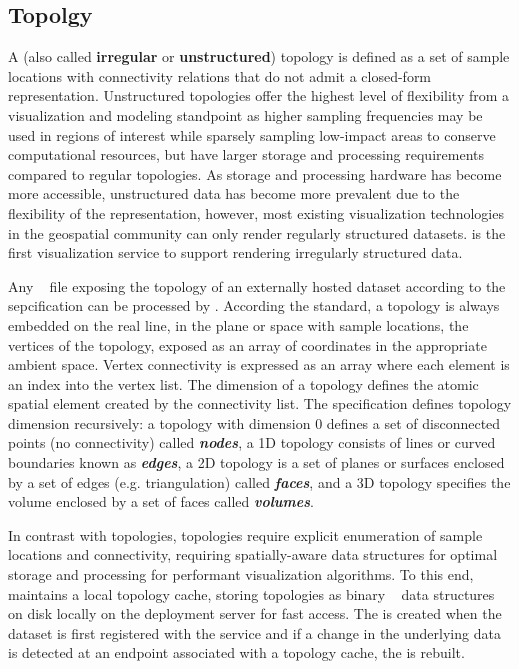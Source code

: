 \subsection{\ugrid{} Topolgy}
\label{sec:ugrid}
A \ugrid{} (also called {\bf irregular} or {\bf unstructured})
topology is defined as a set of sample locations with connectivity
relations that do not admit a closed-form representation. Unstructured
topologies offer the highest level of flexibility from a visualization
and modeling standpoint as higher sampling frequencies may be used in
regions of interest while sparsely sampling low-impact areas to
conserve computational resources, but have larger storage and
processing requirements compared to regular topologies. As storage and
processing hardware has become more accessible, unstructured data has
become more prevalent due to the flexibility of the
representation, however, most existing visualization technologies in
the geospatial community can only render regularly structured
datasets. \sciwms{} is the first visualization service to
support rendering irregularly structured data.

Any \ncml{}~\cite{ncml06} file exposing the topology of an externally
hosted dataset according to the \cfugrid{} sepcification can be
processed by \sciwms{}. According the \cfugrid{} standard, a topology
is always embedded on the real line, in the plane or space with sample
locations, the vertices of the topology, exposed as an array of
coordinates in the appropriate ambient space. Vertex connectivity is
expressed as an array where each element is an index into the vertex
list. The dimension of a topology defines the atomic spatial element
created by the connectivity list. The \cfugrid{} specification defines
topology dimension recursively: a topology with dimension 0 defines a
set of disconnected points (no connectivity) called
\textbf{\textit{nodes}}, a 1D topology consists of lines or curved
boundaries known as \textbf{\textit{edges}}, a 2D topology is a set of
planes or surfaces enclosed by a set of edges (e.g. triangulation)
called \textbf{\textit{faces}}, and a 3D topology specifies the volume
enclosed by a set of faces called \textbf{\textit{volumes}}.

In contrast with \cgrid{} topologies, \ugrid{} topologies require
explicit enumeration of sample locations and connectivity, requiring
spatially-aware data structures for optimal storage and processing for
performant visualization algorithms. To this end, \sciwms{} maintains
a local topology cache, storing \ugrid{} topologies as binary
\rtree{}~\cite{Guttman84} data structures on disk locally on the
deployment server for fast access. The \rtree{} is created when the
dataset is first registered with the \sciwms{} service and if a change
in the underlying data is detected at an endpoint associated with a
topology cache, the \rtree{} is rebuilt.
